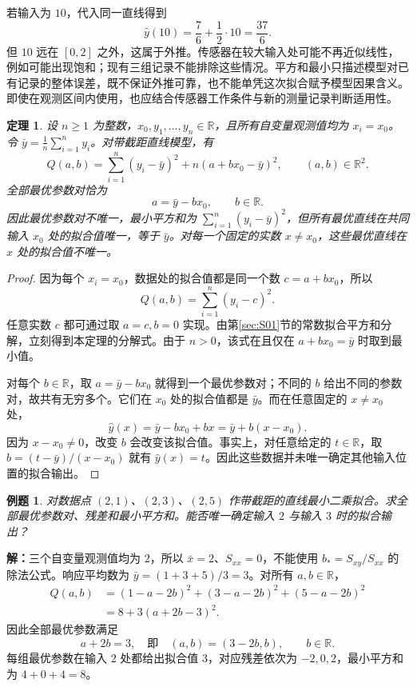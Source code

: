 \documentclass[UTF8,fontset=fandol,11pt]{ctexart}
\newtheorem{theorem}[definition]{定理}
\newtheorem{example}[definition]{例题}
\begin{document}
若输入为 $10$，代入同一直线得到
\[
\hat{y}(10)=\frac76+\frac12\cdot10=\frac{37}{6}.
\]
但 $10$ 远在 $[0,2]$ 之外，这属于外推。传感器在较大输入处可能不再近似线性，例如可能出现饱和；现有三组记录不能排除这些情况。平方和最小只描述模型对已有记录的整体误差，既不保证外推可靠，也不能单凭这次拟合赋予模型因果含义。即使在观测区间内使用，也应结合传感器工作条件与新的测量记录判断适用性。\par
\begin{theorem}
设 $n\geq1$ 为整数，$x_0,y_1,\ldots,y_n\in\mathbb{R}$，且所有自变量观测值均为 $x_i=x_0$。令 $\bar{y}=\frac1n\sum_{i=1}^{n}y_i$。对带截距直线模型，有
\[
Q(a,b)=\sum_{i=1}^{n}(y_i-\bar{y})^2+n(a+bx_0-\bar{y})^2,
\qquad (a,b)\in\mathbb{R}^2.
\]
全部最优参数对恰为
\[
a=\bar{y}-bx_0,\qquad b\in\mathbb{R}.
\]
因此最优参数对不唯一，最小平方和为 $\sum_{i=1}^{n}(y_i-\bar{y})^2$，但所有最优直线在共同输入 $x_0$ 处的拟合值唯一，等于 $\bar{y}$。对每一个固定的实数 $x\ne x_0$，这些最优直线在 $x$ 处的拟合值不唯一。
\end{theorem}
\begin{proof}
因为每个 $x_i=x_0$，数据处的拟合值都是同一个数 $c=a+bx_0$，所以
\[
Q(a,b)=\sum_{i=1}^{n}(y_i-c)^2.
\]
任意实数 $c$ 都可通过取 $a=c,b=0$ 实现。由第\ref{sec:S01}节的常数拟合平方和分解，立刻得到本定理的分解式。由于 $n>0$，该式在且仅在 $a+bx_0=\bar{y}$ 时取到最小值。

对每个 $b\in\mathbb{R}$，取 $a=\bar{y}-bx_0$ 就得到一个最优参数对；不同的 $b$ 给出不同的参数对，故共有无穷多个。它们在 $x_0$ 处的拟合值都是 $\bar{y}$。而在任意固定的 $x\ne x_0$ 处，
\[
\hat{y}(x)=\bar{y}-bx_0+bx=\bar{y}+b(x-x_0).
\]
因为 $x-x_0\ne0$，改变 $b$ 会改变该拟合值。事实上，对任意给定的 $t\in\mathbb{R}$，取 $b=(t-\bar{y})/(x-x_0)$ 就有 $\hat{y}(x)=t$。因此这些数据并未唯一确定其他输入位置的拟合输出。
\end{proof}
\begin{example}
对数据点 $(2,1)$、$(2,3)$、$(2,5)$ 作带截距的直线最小二乘拟合。求全部最优参数对、残差和最小平方和。能否唯一确定输入 $2$ 与输入 $3$ 时的拟合输出？
\end{example}
\par\noindent\textbf{解：}三个自变量观测值均为 $2$，所以 $\bar{x}=2$、$S_{xx}=0$，不能使用 $b_*=S_{xy}/S_{xx}$ 的除法公式。响应平均数为 $\bar{y}=(1+3+5)/3=3$。对所有 $a,b\in\mathbb{R}$，
\[
\begin{aligned}
Q(a,b)&=(1-a-2b)^2+(3-a-2b)^2+(5-a-2b)^2\\
&=8+3(a+2b-3)^2.
\end{aligned}
\]
因此全部最优参数满足
\[
a+2b=3,
\quad\text{即}\quad (a,b)=(3-2b,b),\qquad b\in\mathbb{R}.
\]
每组最优参数在输入 $2$ 处都给出拟合值 $3$，对应残差依次为 $-2,0,2$，最小平方和为 $4+0+4=8$。
\end{document}
